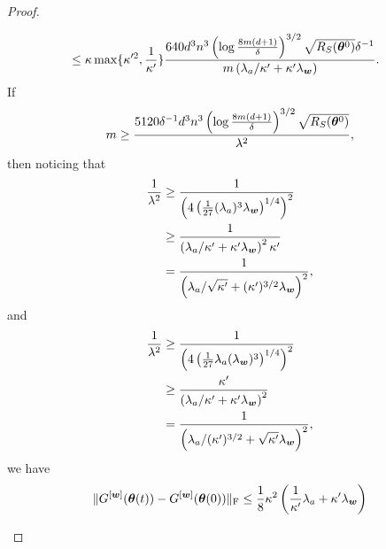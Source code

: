 \documentclass{article}
\begin{document}
\begin{proof}
\begin{enumerate}[(a)]
\begin{enumerate}[(i)]
\begin{equation}
\begin{aligned}
                                 & \leq\kappa\max\{\kappa'^2,\frac{1}{\kappa'}\}\frac{640 d^3n^3\left(\log\frac{8m(d+1)}{\delta}\right)^{3/2}\sqrt{R_S(\bm{\theta}^0)}\delta^{-1}}{m\left(\lambda_a/\kappa'+\kappa'\lambda_{\bm{w}}\right)}.
                            \end{aligned}
                        \end{equation}
                        If
                        \begin{equation}
                            m\geq\frac{5120\delta^{-1}d^3n^3\left(\log\frac{8m(d+1)}{\delta}\right)^{3/2}\sqrt{R_S(\bm{\theta}^0)}}{\lambda^2},
                        \end{equation}
                        then noticing that
                        \begin{equation}
                            \begin{aligned}
                                \frac{1}{\lambda^2}
                                 & \geq\frac{1}{\left(4\left(\frac{1}{27}(\lambda_a)^3\lambda_{\bm{w}}\right)^{1/4}\right) ^2} \\
                                 & \geq\frac{1}{\left(\lambda_a/\kappa'+\kappa'\lambda_{\bm{w}}\right)^2\kappa'}               \\
                                 & =\frac{1}{\left(\lambda_a/\sqrt{\kappa'}+(\kappa')^{3/2}\lambda_{\bm{w}}\right)^2},
                            \end{aligned}
                        \end{equation}
                        and
                        \begin{equation}
                            \begin{aligned}
                                \frac{1}{\lambda^2}
                                 & \geq\frac{1}{\left(4\left(\frac{1}{27}\lambda_a(\lambda_{\bm{w}})^3\right)^{1/4}\right) ^2} \\
                                 & \geq\frac{\kappa'}{\left(\lambda_a/\kappa'+\kappa'\lambda_{\bm{w}}\right)^2}                \\
                                 & =\frac{1}{\left(\lambda_a/(\kappa')^{3/2}+\sqrt{\kappa'}\lambda_{\bm{w}}\right)^2},
                            \end{aligned}
                        \end{equation}
                        we have
                        \begin{equation}\label{thm-proof:step2}
                            \norm{G^{[\vw]}(\vtheta(t))-G^{[\vw]}(\vtheta(0))}_\mathrm{F}\leq\frac{1}{8}\kappa^2\left(\frac{1}{\kappa'}\lambda_a+\kappa'\lambda_{\vw}\right)

\end{equation}
\end{enumerate}
\end{enumerate}
\end{proof}
\end{document}
